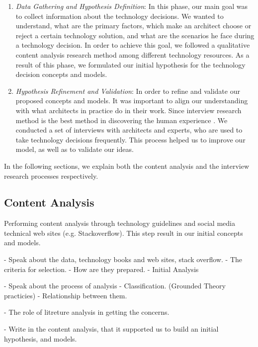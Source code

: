 \documentclass[conference]{IEEEtran}
\begin{document}
\begin{enumerate}
\item \textit{Data Gathering and Hypothesis Definition}: In this phase, our main
goal was to collect information about the technology decisions. We wanted to understand,
what are the primary factors, which make an architect choose or reject a certain
technology solution, and what are the scenarios he face during a technology
decision. In order to achieve this goal, we followed a qualitative content
analysis research method among different technology resources. As a result of
this phase, we formulated our initial hypothesis for the technology
decision concepts and models.
\item \textit{Hypothesis Refinement and Validation}: In order to refine and
validate our proposed concepts and models. It was important to align our
understanding with what architects in practice do in their work. Since
interview research method is the best method in discovering the human
experience \cite{seidman2006interviewing}. We conducted a set of
interviews with architects and experts, who are used to take technology
decisions frequently. This process helped us to improve our model, as well as to
validate our ideas.
\end{enumerate}
In the following sections, we explain both the content analysis and the
interview research processes respectively.
\subsection{Content Analysis}
\label{sec:contentanalysis}
Performing content analysis through technology
guidelines and social media technical web sites (e.g. Stackoverflow). This step result in our initial
concepts and models.

- Speak about the data, technology books and web sites, stack overflow.
	- The criteria for selection.
	- How are they prepared.
	- Initial Analysis
	
- Speak about the process of analysis
	- Classification. (Grounded Theory practicies)
	- Relationship between them.

- The role of litreture analysis in getting the concerns.

- Write in the content analysis, that it supported us to build an initial
hypothesis, and models.
\end{document}
